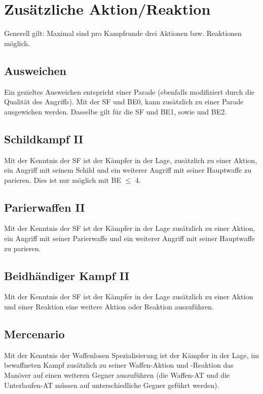 %


\chapter{Zusätzliche Aktion/Reaktion}
\label{chap.aktion}
Generell gilt: Maximal sind pro Kampfrunde drei Aktionen bzw. Reaktionen möglich.

\section{Ausweichen}
\label{chap.aktion.ausweichen}
Ein gezieltes Ausweichen entspricht einer Parade (ebenfalls modifiziert durch die Qualität des Angriffs). Mit der SF  und BE0, kann zusätzlich zu einer Parade ausgewichen werden.
Dasselbe gilt für die SF  und BE1, sowie  und BE2.

\section{Schildkampf II}
\label{chap.aktion.schildkampf}
Mit der Kenntnis der SF  ist der Kämpfer in der Lage, zusätzlich zu einer Aktion, ein Angriff mit seinem Schild und ein weiterer Angriff mit seiner Hauptwaffe zu parieren.
Dies ist nur möglich mit BE\textrm{ ${\leq}$ }4.

\section{Parierwaffen II}
\label{chap.aktion.parierwaffen}
Mit der Kenntnis der SF  ist der Kämpfer in der Lage zusätzlich zu einer Aktion, ein Angriff mit seiner Parierwaffe und ein weiterer Angriff mit seiner Hauptwaffe zu parieren.

\section{Beidhändiger Kampf II}
\label{chap.aktion.beidhaendiger_kampf}
Mit der Kenntnis der SF  ist der Kämpfer in der Lage zusätzlich zu einer Aktion und einer Reaktion eine weitere Aktion oder Reaktion auszuführen.

\section{Mercenario}
\label{chap.aktion.mercenario}
Mit der Kenntnis der Waffenlosen Spezialisierung  ist der Kämpfer in der Lage, im bewaffneten Kampf zusätzlich zu seiner Waffen-Aktion und -Reaktion das Manöver  auf einen weiteren Gegner auszuführen (die Waffen-AT und die Unterlaufen-AT müssen auf unterschiedliche Gegner geführt werden).
